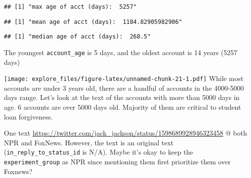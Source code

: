 \documentclass[
]{article}
\newenvironment{Shaded}{\begin{snugshade}}{\end{snugshade}}
\newcommand{\FunctionTok}[1]{\textcolor[rgb]{0.00,0.00,0.00}{#1}}
\newcommand{\NormalTok}[1]{#1}
\newcommand{\SpecialCharTok}[1]{\textcolor[rgb]{0.00,0.00,0.00}{#1}}
\newcommand{\StringTok}[1]{\textcolor[rgb]{0.31,0.60,0.02}{#1}}
\begin{document}
\begin{verbatim}
## [1] "max age of acct (days):  5257"
\end{verbatim}

\begin{Shaded}
\end{Shaded}

\begin{verbatim}
## [1] "mean age of acct (days):  1184.82905982906"
\end{verbatim}

\begin{Shaded}
\end{Shaded}

\begin{verbatim}
## [1] "median age of acct (days):  268.5"
\end{verbatim}

The youngest \texttt{account\_age} is 5 days, and the oldest account is
14 years (5257 days)

\begin{Shaded}
\end{Shaded}

\texttt{[image: explore\_files/figure-latex/unnamed-chunk-21-1.pdf]}
While most accounts are under 3 years old, there are a handful of
accounts in the 4000-5000 days range. Let's look at the text of the
accounts with more than 5000 days in age. 6 accounts are over 5000 days
old. Majority of them are critical to student loan forgiveness.

One text
\url{https://twitter.com/jack_jackson/status/1598689928946323458} @ both
NPR and FoxNews. However, the text is an original text
(\texttt{in\_reply\_to\_status\_id} is N/A). Maybe it's okay to keep the
\texttt{experiment\_group} as NPR since mentioning them first prioritize
them over Foxnews?
\end{document}
